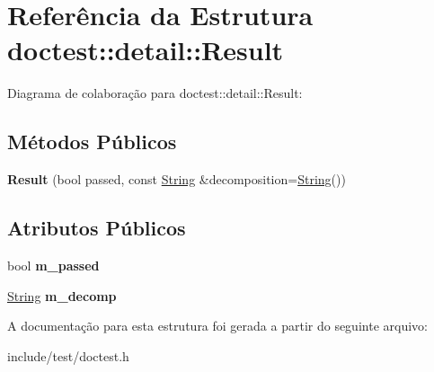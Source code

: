 \hypertarget{structdoctest_1_1detail_1_1Result}{}\section{Referência da Estrutura doctest\+:\+:detail\+:\+:Result}
\label{structdoctest_1_1detail_1_1Result}


Diagrama de colaboração para doctest\+:\+:detail\+:\+:Result\+:
\subsection*{Métodos Públicos}
\begin{DoxyCompactItemize}
\item 
\mbox{\label{structdoctest_1_1detail_1_1Result_ae4d2e8633aedaffa31f5c8b8530f522c}} 
{\bfseries Result} (bool passed, const \hyperlink{classdoctest_1_1String}{String} \&decomposition=\hyperlink{classdoctest_1_1String}{String}())
\end{DoxyCompactItemize}
\subsection*{Atributos Públicos}
\begin{DoxyCompactItemize}
\item 
\mbox{\label{structdoctest_1_1detail_1_1Result_a03ff571186856a429ada967ddfdf3006}} 
bool {\bfseries m\+\_\+passed}
\item 
\mbox{\label{structdoctest_1_1detail_1_1Result_a97968e037266580a799ab3deb9365b79}} 
\hyperlink{classdoctest_1_1String}{String} {\bfseries m\+\_\+decomp}
\end{DoxyCompactItemize}


A documentação para esta estrutura foi gerada a partir do seguinte arquivo\+:\begin{DoxyCompactItemize}
\item 
include/test/doctest.\+h\end{DoxyCompactItemize}
